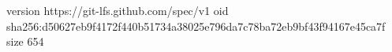 version https://git-lfs.github.com/spec/v1
oid sha256:d50627eb9f4172f440b51734a38025e796da7c78ba72eb9bf43f94167e45ca7f
size 654
